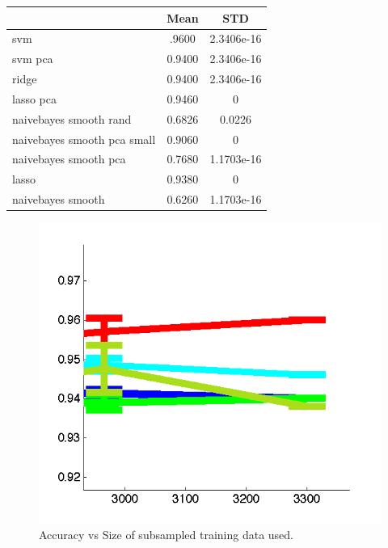 \documentclass[]{article}
\begin{document}
\begin{tabular}{lcc}
\hline
& Mean & STD \\
\hline
svm & .9600 & 2.3406e-16\\
svm pca & 0.9400 & 2.3406e-16\\
ridge & 0.9400 & 2.3406e-16\\
lasso pca & 0.9460 & 0 \\
naivebayes smooth rand & 0.6826 & 0.0226\\
naivebayes smooth pca small & 0.9060 & 0\\
naivebayes smooth pca & 0.7680 & 1.1703e-16\\
lasso & 0.9380 & 0\\
naivebayes smooth & 0.6260 & 1.1703e-16
\end{tabular}
\begin{center}
\begin{figure}[!ht]
\centering
\includegraphics[width=.7\textwidth]{../images/c3zoombig.png}
\caption{Accuracy vs Size of subsampled training data used.}
\label{fig:largecomparekleg}
\end{figure}
\end{center}
\end{document}
